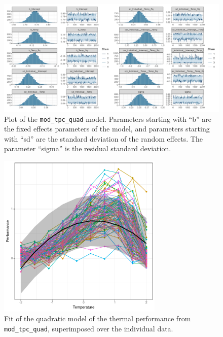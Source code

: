 \documentclass[a4paper,12pt,twoside]{article}
\begin{document}
\begin{figure}[t!h!]
  \includegraphics[width = \textwidth]{TPC_discrete_quadratic_model.png}
  \caption{Plot of the \texttt{mod\_tpc\_quad} model. Parameters starting with ``b'' are the fixed effects parameters of the model, and parameters starting with ``sd'' are the standard deviation of the random effects. The parameter ``sigma'' is the residual standard deviation.}
  \label{fig_mod_tpc_quad_ds}
\end{figure}

\begin{figure}[b!h!]
  \includegraphics[width = 0.7\textwidth]{TPC_discrete_quadratic_pred.pdf}
  \caption{Fit of the quadratic model of the thermal performance from \texttt{mod\_tpc\_quad}, superimposed over the individual data.}
  \label{fig_pred_agr}
\end{figure}
\end{document}
